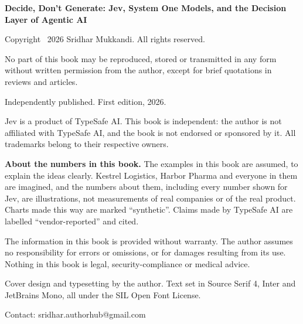 {\sffamily\fontsize{7.2}{10}\selectfont\color{ink2}\raggedright
\textbf{Decide, Don't Generate: Jev, System One Models, and the Decision Layer of Agentic AI}\par\medskip
Copyright \textcopyright\ 2026 Sridhar Mukkandi. All rights reserved.\par\medskip
No part of this book may be reproduced, stored or transmitted in any form without written permission from the
author, except for brief quotations in reviews and articles.\par\medskip
Independently published. First edition, 2026.\par\medskip
Jev is a product of TypeSafe AI. This book is independent: the author is not affiliated with TypeSafe AI, and the
book is not endorsed or sponsored by it. All trademarks belong to their respective owners.\par\medskip
\textbf{About the numbers in this book.} The examples in this book are assumed, to explain the ideas clearly.
Kestrel Logistics, Harbor Pharma and everyone in them are imagined, and the numbers about them, including every
number shown for Jev, are illustrations, not measurements of real companies or of the real product. Charts made
this way are marked ``synthetic''. Claims made by TypeSafe AI are labelled ``vendor-reported'' and cited.\par\medskip
The information in this book is provided without warranty. The author assumes no responsibility for errors or
omissions, or for damages resulting from its use. Nothing in this book is legal, security-compliance or medical
advice.\par\medskip
Cover design and typesetting by the author. Text set in Source Serif 4, Inter and JetBrains Mono, all under the
SIL Open Font License.\par\medskip
Contact: sridhar.authorhub@gmail.com\par}
\clearpage
